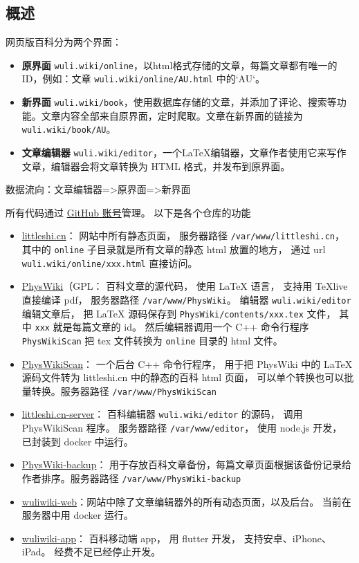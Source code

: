 
\subsection{概述}
网页版百科分为两个界面：
\begin{itemize}
\item \textbf{原界面} \verb|wuli.wiki/online|，以html格式存储的文章，每篇文章都有唯一的ID，例如：文章 \verb|wuli.wiki/online/AU.html| 中的`AU`。 
\item \textbf{新界面} \verb|wuli.wiki/book|，使用数据库存储的文章，并添加了评论、搜索等功能。文章内容全部来自原界面，定时爬取。文章在新界面的链接为 \verb|wuli.wiki/book/AU|。
\item \textbf{文章编辑器} \verb|wuli.wiki/editor|，一个LaTeX编辑器，文章作者使用它来写作文章，编辑器会将文章转换为 HTML 格式，并发布到原界面。
\end{itemize}
数据流向：文章编辑器=>原界面=>新界面


所有代码通过 \href{https://github.com/wuliwiki}{GitHub 账号}管理。 以下是各个仓库的功能
\begin{itemize}
\item \href{https://github.com/MacroUniverse/littleshi.cn}{littleshi.cn}： 网站中所有静态页面， 服务器路径 \verb|/var/www/littleshi.cn|， 其中的 \verb`online` 子目录就是所有文章的静态 html 放置的地方， 通过 url \verb`wuli.wiki/online/xxx.html` 直接访问。
\item \href{https://github.com/MacroUniverse/PhysWiki}{PhysWiki}（GPL： 百科文章的源代码， 使用 LaTeX 语言， 支持用 TeXlive 直接编译 pdf， 服务器路径 \verb|/var/www/PhysWiki|。 编辑器 \verb`wuli.wiki/editor` 编辑文章后， 把 LaTeX 源码保存到 \verb`PhysWiki/contents/xxx.tex` 文件， 其中 \verb`xxx` 就是每篇文章的 id。 然后编辑器调用一个 C++ 命令行程序 \verb`PhysWikiScan` 把 tex 文件转换为 \verb`online` 目录的 html 文件。
\item \href{https://github.com/MacroUniverse/PhysWikiScan}{PhysWikiScan}： 一个后台 C++ 命令行程序， 用于把 PhysWiki 中的 LaTeX 源码文件转为 littleshi.cn 中的静态的百科 html 页面， 可以单个转换也可以批量转换。服务器路径 \verb|/var/www/PhysWikiScan|
\item \href{https://github.com/MacroUniverse/littleshi.cn-server}{littleshi.cn-server}： 百科编辑器 \verb`wuli.wiki/editor` 的源码， 调用 PhysWikiScan 程序。 服务器路径 \verb|/var/www/editor|， 使用 node.js 开发， 已封装到 docker 中运行。
\item \href{https://github.com/MacroUniverse/PhysWiki-backup}{PhysWiki-backup}： 用于存放百科文章备份，每篇文章页面根据该备份记录给作者排序。服务器路径 \verb|/var/www/PhysWiki-backup|
\item \href{https://github.com/MacroUniverse/wuliwiki-web}{wuliwiki-web}：网站中除了文章编辑器外的所有动态页面，以及后台。 当前在服务器中用 docker 运行。
\item \href{https://github.com/MacroUniverse/wuliwiki-app}{wuliwiki-app}： 百科移动端 app， 用 flutter 开发， 支持安卓、iPhone、iPad。 经费不足已经停止开发。
\end{itemize}

